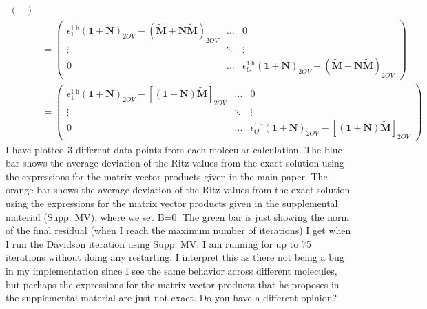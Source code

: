 \begin{align}
\begin{pmatrix}
\end{pmatrix}\\
&= \begin{pmatrix}
\epsilon^{1 \mathrm{~h}}_{1} \left(\bm{1} + \bm{N}\right)_{2OV} - \left(\tilde{\bm{M}}+\bm{N} \tilde{\bm{M}}\right)_{2OV} & \dots & 0 \\[6pt]
\vdots  & \ddots & \vdots \\[6pt]
0 & \dots & \epsilon^{1 \mathrm{~h}}_{O} \left(\bm{1} + \bm{N}\right)_{2OV} - \left(\tilde{\bm{M}}+\bm{N} \tilde{\bm{M}}\right)_{2OV}
\end{pmatrix}\\
&= \begin{pmatrix}
\epsilon^{1 \mathrm{~h}}_{1} \left(\bm{1} + \bm{N}\right)_{2OV} -  \left[\left(\bm{1} + \bm{N}\right)\tilde{\bm{M}}\right]_{2OV} & \dots & 0 \\[6pt]
\vdots  & \ddots & \vdots \\[6pt]
0 & \dots & \epsilon^{1 \mathrm{~h}}_{O} \left(\bm{1} + \bm{N}\right)_{2OV} -  \left[\left(\bm{1} + \bm{N}\right)\tilde{\bm{M}}\right]_{2OV}
\end{pmatrix}
\end{align}
I have plotted 3 different data points from each molecular calculation. The blue bar shows the average deviation of the Ritz values from the exact solution using the expressions for the matrix vector products given in the main paper. The orange bar shows the average deviation of the Ritz values from the exact solution using the expressions for the matrix vector products given in the supplemental material (Supp. MV), where we set B=0. The green bar is just showing the norm of the final residual (when I reach the maximum number of iterations) I get when I run the Davidson iteration using Supp. MV. I am running for up to 75 iterations without doing any restarting. I interpret this as there not being a bug in my implementation since I see the same behavior across different molecules, but perhaps the expressions for the matrix vector products that he proposes in the supplemental material are just not exact. Do you have a different opinion?
